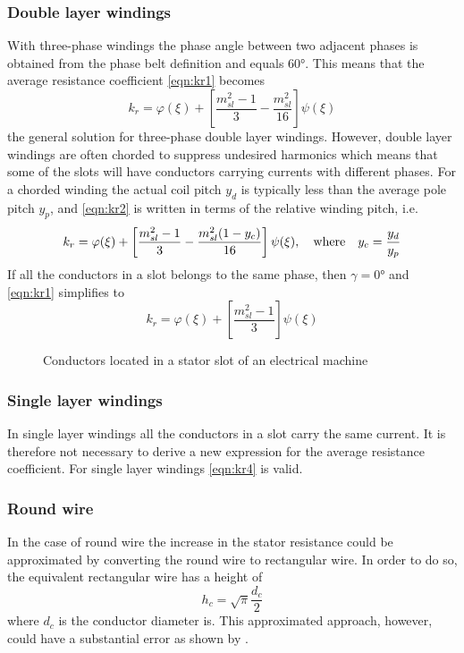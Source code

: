 \subsubsection{Double layer windings}
With three-phase windings the phase angle between two adjacent phases is obtained from the phase belt definition and equals \ang{60}. This means that the average resistance coefficient \eqref{eqn:kr1} becomes 
\begin{equation}
  \label{eqn:kr2}
  k_r = \varphi(\xi)+
  \left[
  \frac{m_{sl}^2-1}{3}-\frac{m_{sl}^2}{16}
  \right]
  \psi(\xi) 
\end{equation}
the general solution for three-phase double layer windings. However, double layer windings are often chorded to suppress undesired harmonics which means that some of the slots will have conductors carrying currents with different phases. For a chorded winding the actual coil pitch $y_d$ is typically less than the average pole pitch $y_p$, and \eqref{eqn:kr2} is written in terms of the relative winding pitch, i.e.
\begin{equation}
  \label{eqn:kr3}
  k_r = \varphi(\xi)+
  \left[
  \frac{m_{sl}^2-1}{3}-\frac{m_{sl}^2(1-y_c)}{16}
  \right]
  \psi(\xi), \quad \textnormal{where} \quad y_c=\frac{y_d}{y_p}
\end{equation}
If all the conductors in a slot belongs to the same phase, then $\gamma=\ang{0}$ and \eqref{eqn:kr1} simplifies to
\begin{equation}
  \label{eqn:kr4}
  k_r = \varphi(\xi)+
  \left[
  \frac{m_{sl}^2-1}{3}
  \right]
  \psi(\xi)
\end{equation}

\begin{figure}[htbp]
	\centering
	
	\vspace{1.5cm}
	
	\caption{Conductors located in a stator slot of an electrical machine}
	\label{fig:Main_eddy_loss}
\end{figure}

\subsubsection{Single layer windings}  
In single layer windings all the conductors in a slot carry the same current. It is therefore not necessary to derive a new expression for the average resistance coefficient. For single layer windings \eqref{eqn:kr4} is valid.

\subsubsection{Round wire}
In the case of round wire the increase in the stator resistance could be approximated by converting the round wire to rectangular wire. In order to do so, the equivalent rectangular wire has a height of
\begin{equation}
  \label{eqn:hc_roundwire}
  h_c = \sqrt{\pi}\frac{d_c}{2}
\end{equation}
where $d_c$ is the conductor diameter is. This approximated approach, however, could have a substantial error as shown by \cite{Nan2005}.


